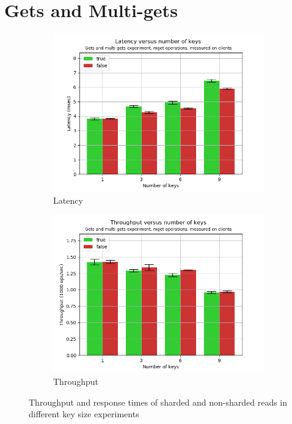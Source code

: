 \documentclass[11pt,a4paper]{article}
\begin{document}
\section{Gets and Multi-gets} \label{sec:gmg}
\begin{figure}[h]
\begin{subfigure}{.5\textwidth}
  \centering
  \includegraphics[width=1.0\linewidth ,trim={0 0 0 0},clip]{img/plot/gmg-mget-lat_cli.png}
  \caption{Latency}
  \label{fig:gmg-mget-lat_cli}
\end{subfigure}%
\begin{subfigure}{.5\textwidth}
  \centering
  \includegraphics[width=1.0\linewidth ,trim={0 0 0 0},clip]{img/plot/gmg-mget-tpt_cli.png}
  \caption{Throughput}
  \label{fig:gmg-mget-tpt_cli}
\end{subfigure}
\caption{Throughput and response times of sharded and non-sharded reads in different key size experiments}
\label{fig:gmg-mget_cli}
\end{figure}
\end{document}
